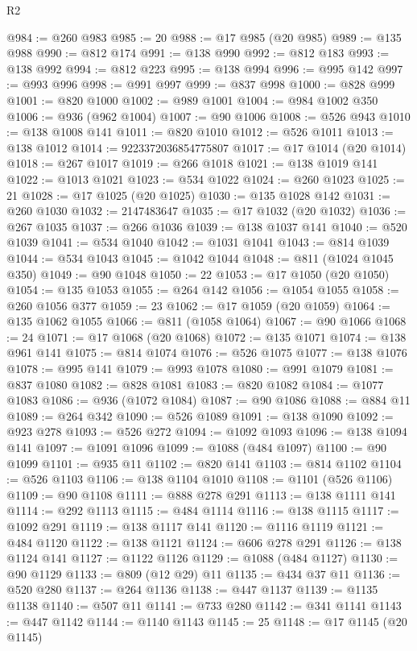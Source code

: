 \begin{lexlean}{R2}
\begin{coremodule}
@984 := @260 @983
@985 := 20
@988 := @17 @985 (@20 @985)
@989 := @135 @988
@990 := @812 @174
@991 := @138 @990
@992 := @812 @183
@993 := @138 @992
@994 := @812 @223
@995 := @138 @994
@996 := @995 @142
@997 := @993 @996
@998 := @991 @997
@999 := @837 @998
@1000 := @828 @999
@1001 := @820 @1000
@1002 := @989 @1001
@1004 := @984 @1002 @350
@1006 := @936 (@962 @1004)
@1007 := @90 @1006
@1008 := @526 @943
@1010 := @138 @1008 @141
@1011 := @820 @1010
@1012 := @526 @1011
@1013 := @138 @1012
@1014 := 9223372036854775807
@1017 := @17 @1014 (@20 @1014)
@1018 := @267 @1017
@1019 := @266 @1018
@1021 := @138 @1019 @141
@1022 := @1013 @1021
@1023 := @534 @1022
@1024 := @260 @1023
@1025 := 21
@1028 := @17 @1025 (@20 @1025)
@1030 := @135 @1028 @142
@1031 := @260 @1030
@1032 := 2147483647
@1035 := @17 @1032 (@20 @1032)
@1036 := @267 @1035
@1037 := @266 @1036
@1039 := @138 @1037 @141
@1040 := @520 @1039
@1041 := @534 @1040
@1042 := @1031 @1041
@1043 := @814 @1039
@1044 := @534 @1043
@1045 := @1042 @1044
@1048 := @811 (@1024 @1045 @350)
@1049 := @90 @1048
@1050 := 22
@1053 := @17 @1050 (@20 @1050)
@1054 := @135 @1053
@1055 := @264 @142
@1056 := @1054 @1055
@1058 := @260 @1056 @377
@1059 := 23
@1062 := @17 @1059 (@20 @1059)
@1064 := @135 @1062 @1055
@1066 := @811 (@1058 @1064)
@1067 := @90 @1066
@1068 := 24
@1071 := @17 @1068 (@20 @1068)
@1072 := @135 @1071
@1074 := @138 @961 @141
@1075 := @814 @1074
@1076 := @526 @1075
@1077 := @138 @1076
@1078 := @995 @141
@1079 := @993 @1078
@1080 := @991 @1079
@1081 := @837 @1080
@1082 := @828 @1081
@1083 := @820 @1082
@1084 := @1077 @1083
@1086 := @936 (@1072 @1084)
@1087 := @90 @1086
@1088 := @884 @11
@1089 := @264 @342
@1090 := @526 @1089
@1091 := @138 @1090
@1092 := @923 @278
@1093 := @526 @272
@1094 := @1092 @1093
@1096 := @138 @1094 @141
@1097 := @1091 @1096
@1099 := @1088 (@484 @1097)
@1100 := @90 @1099
@1101 := @935 @11
@1102 := @820 @141
@1103 := @814 @1102
@1104 := @526 @1103
@1106 := @138 @1104 @1010
@1108 := @1101 (@526 @1106)
@1109 := @90 @1108
@1111 := @888 @278 @291
@1113 := @138 @1111 @141
@1114 := @292 @1113
@1115 := @484 @1114
@1116 := @138 @1115
@1117 := @1092 @291
@1119 := @138 @1117 @141
@1120 := @1116 @1119
@1121 := @484 @1120
@1122 := @138 @1121
@1124 := @606 @278 @291
@1126 := @138 @1124 @141
@1127 := @1122 @1126
@1129 := @1088 (@484 @1127)
@1130 := @90 @1129
@1133 := @809 (@12 @29) @11
@1135 := @434 @37 @11
@1136 := @520 @280
@1137 := @264 @1136
@1138 := @447 @1137
@1139 := @1135 @1138
@1140 := @507 @11
@1141 := @733 @280
@1142 := @341 @1141
@1143 := @447 @1142
@1144 := @1140 @1143
@1145 := 25
@1148 := @17 @1145 (@20 @1145)

\end{coremodule}
\end{lexlean}
